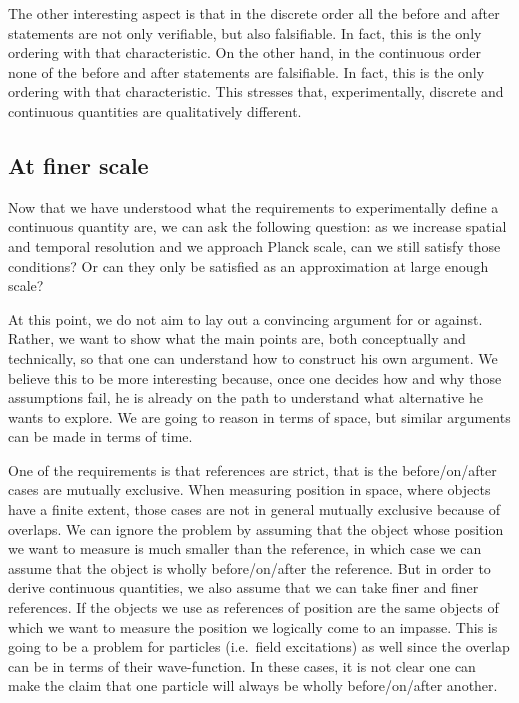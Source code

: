 \documentclass{article}
\begin{document}
The other interesting aspect is that in the discrete order all the before and after statements are not only verifiable, but also falsifiable. In fact, this is the only ordering with that characteristic. On the other hand, in the continuous order none of the before and after statements are falsifiable. In fact, this is the only ordering with that characteristic. This stresses that, experimentally, discrete and continuous quantities are qualitatively different.

\subsection*{At finer scale}

Now that we have understood what the requirements to experimentally define a continuous quantity are, we can ask the following question: as we increase spatial and temporal resolution and we approach Planck scale, can we still satisfy those conditions? Or can they only be satisfied as an approximation at large enough scale?

At this point, we do not aim to lay out a convincing argument for or against. Rather, we want to show what the main points are, both conceptually and technically, so that one can understand how to construct his own argument. We believe this to be more interesting because, once one decides how and why those assumptions fail, he is already on the path to understand what alternative he wants to explore. We are going to reason in terms of space, but similar arguments can be made in terms of time.

One of the requirements is that references are strict, that is the before/on/after cases are mutually exclusive. When measuring position in space, where objects have a finite extent, those cases are not in general mutually exclusive because of overlaps. We can ignore the problem by assuming that the object whose position we want to measure is much smaller than the reference, in which case we can assume that the object is wholly before/on/after the reference. But in order to derive continuous quantities, we also assume that we can take finer and finer references. If the objects we use as references of position are the same objects of which we want to measure the position we logically come to an impasse. This is going to be a problem for particles (i.e.~field excitations) as well since the overlap can be in terms of their wave-function. In these cases, it is not clear one can make the claim that one particle will always be wholly before/on/after another.
\end{document}
